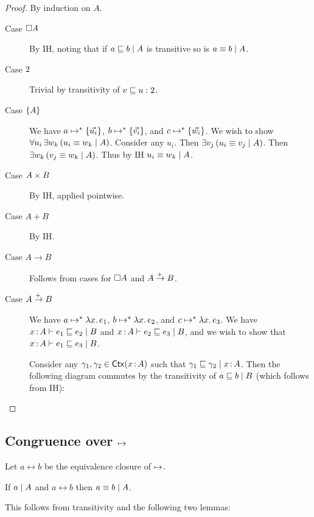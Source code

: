 \documentclass{article}
\newcommand{\betaeq}{\leftrightarrow}
\begin{document}
\begin{proof}
  By induction on $A$.
  \begin{description}
    \item[Case $\disc A$] By IH, noting that if $\lr{A}{a \ale b}$ is transitive
      so is $\lr{A}{a \aeq b}$.
    \item[Case $\bool$] Trivial by transitivity of $v \ale u : \bool$.
    \item[Case $\Set{A}$] We have $a \steps \setlit{\vec{u_i}}$, $b \steps
      \setlit{\vec{v_i}}$, and $c \steps \setlit{\vec{w_i}}$. We wish to show
      $\forall u_i\, \exists w_k\, (\lr{A}{u_i \aeq w_k})$. Consider any $u_i$.
      Then $\exists v_j\, (\lr{A}{u_i \aeq v_j})$. Then $\exists w_k\,
      (\lr{A}{v_j \aeq w_k})$. Thus by IH $\lr{A}{u_i \aeq w_k}$.
    \item[Case $A \x B$] By IH, applied pointwise. 
    \item[Case $A + B$] By IH. 
    \item[Case $A \to B$] Follows from cases for $\disc{A}$ and $A \mto B$.

    \item[Case $A \mto B$] We have $a \steps \fn\bind{x}e_1$, $b \steps
      \fn\bind{x}e_2$, and $c \steps \fn\bind{x}e_3$. We have $\lrcx{x \of
        A}{B}{e_1 \ale e_2}$ and $\lrcx{x \of A}{B}{e_2 \ale e_3}$, and we wish to
      show that $\lrcx{x\of A}{B}{e_1 \ale e_3}$.

      Consider any $\gamma_1, \gamma_2 \in \ms{Ctx}(x \of A)$ such that $\lr{x
        \of A}{\gamma_1 \ale \gamma_2}$. Then the following diagram commutes by
      the transitivity of $\lr{B}{a \ale b}$ (which follows from IH):
  \end{description}
\end{proof}


\subsection{Congruence over $\step$}

Let $a \betaeq b$ be the equivalence closure of $\step$.

\begin{theorem}\label{thm:congbeta}
  If $\lr{A}{a}$ and $a \betaeq b$ then $\lr{A}{a \aeq b}$.
\end{theorem}

This follows from transitivity and the following two
lemmas:
\end{document}
